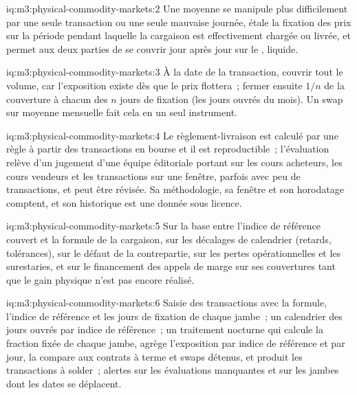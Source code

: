 \begin{solution}{iq:m3:physical-commodity-markets:2}
Une moyenne se manipule plus difficilement par une seule transaction ou une seule mauvaise journée, étale la fixation des prix sur
la période pendant laquelle la cargaison est effectivement chargée ou livrée, et permet aux deux parties de se couvrir jour après
jour sur le , liquide.
\end{solution}

\begin{solution}{iq:m3:physical-commodity-markets:3}
À la date de la transaction, couvrir tout le volume, car l'exposition existe dès que
le prix flottera~; fermer ensuite $1/n$ de la couverture à chacun des $n$ jours de fixation
(les jours ouvrés du mois). Un swap sur moyenne mensuelle fait cela en un seul instrument.
\end{solution}

\begin{solution}{iq:m3:physical-commodity-markets:4}
Le règlement-livraison est calculé par une règle à partir des transactions en bourse et il est reproductible~;
l'évaluation relève d'un jugement d'une équipe éditoriale portant sur les cours acheteurs, les cours vendeurs et les transactions sur une
fenêtre, parfois avec peu de transactions, et peut être révisée. Sa méthodologie, sa fenêtre et
son horodatage comptent, et son historique est une donnée sous licence.
\end{solution}

\begin{solution}{iq:m3:physical-commodity-markets:5}
Sur la base entre l'indice de référence couvert et la formule de la cargaison, sur les décalages de calendrier
(retards, tolérances), sur le défaut de la contrepartie, sur les pertes opérationnelles et les surestaries,
et sur le financement des appels de marge sur ses couvertures tant que le gain physique n'est
pas encore réalisé.
\end{solution}

\begin{solution}{iq:m3:physical-commodity-markets:6}
Saisie des transactions avec la formule, l'indice de référence et les jours de fixation de chaque jambe~; un calendrier
des jours ouvrés par indice de référence~; un traitement nocturne qui calcule la fraction fixée de chaque
jambe, agrège l'exposition par indice de référence et par jour, la compare aux contrats à terme et swaps
détenus, et produit les transactions à solder~; alertes sur les évaluations manquantes et sur les jambes
dont les dates se déplacent.
\end{solution}
